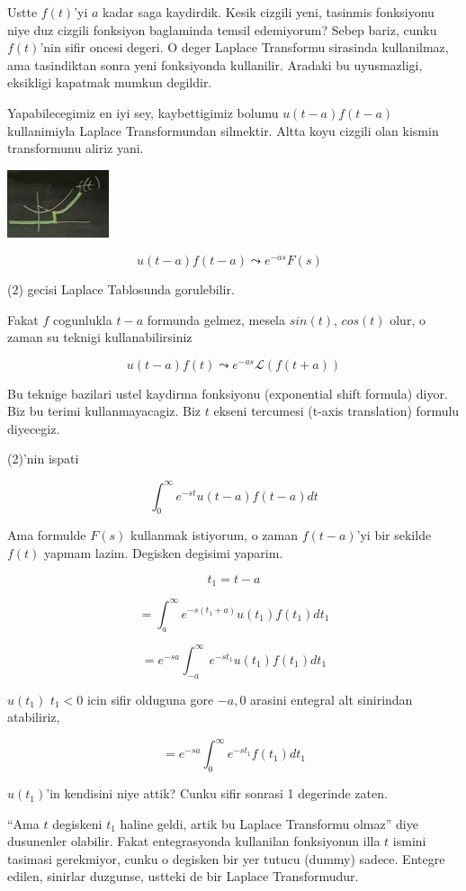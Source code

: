 \documentclass[12pt,fleqn]{article}\usepackage{../common}
\begin{document}
Ustte $f(t)$'yi $a$ kadar saga kaydirdik. Kesik cizgili yeni, tasinmis
fonksiyonu niye duz cizgili fonksiyon baglaminda temsil edemiyorum? Sebep
bariz, cunku $f(t)$'nin sifir oncesi degeri. O deger Laplace Transformu
sirasinda kullanilmaz, ama tasindiktan sonra yeni fonksiyonda
kullanilir. Aradaki bu uyusmazligi, eksikligi kapatmak mumkun degildir. 

Yapabilecegimiz en iyi sey, kaybettigimiz bolumu $u(t-a)f(t-a)$ kullanimiyla
Laplace Transformundan silmektir. Altta koyu cizgili olan kismin
transformunu aliriz yani.

\includegraphics[height=2cm]{22_8.png}

\[ u(t-a)f(t-a) \leadsto e^{-as}F(s) 
\ \ \ \label{2}
\]

(2) gecisi Laplace Tablosunda gorulebilir.

Fakat $f$ cogunlukla $t-a$ formunda gelmez, mesela $sin(t)$, $cos(t)$
olur, o zaman su teknigi kullanabilirsiniz

\[ u(t-a)f(t) \leadsto e^{-as}\mathcal{L}(f(t+a)) \]

Bu teknige bazilari ustel kaydirma fonksiyonu (exponential shift formula)
diyor. Biz bu terimi kullanmayacagiz. Biz $t$ ekseni tercumesi (t-axis
translation) formulu diyecegiz. 

(2)'nin ispati

\[ \int_{0}^{\infty}e^{-st}u(t-a)f(t-a) dt \]

Ama formulde $F(s)$ kullanmak istiyorum, o zaman $f(t-a)$'yi bir sekilde
$f(t)$ yapmam lazim. Degisken degisimi yaparim. 

\[ t_1 = t-a \]

\[ = \int_{a}^{\infty}e^{-s(t_1+a)}u(t_1)f(t_1) dt_1 \]

\[ = e^{-sa} \int_{-a}^{\infty}e^{-st_1}u(t_1)f(t_1) dt_1 \]

$u(t_1)$ $t_1<0$ icin sifir olduguna gore $-a,0$ arasini entegral alt
sinirindan atabiliriz, 

\[ = e^{-sa} \int_{0}^{\infty}e^{-st_1}f(t_1) dt_1 \]

$u(t_1)$'in kendisini niye attik? Cunku sifir sonrasi 1 degerinde zaten. 

``Ama $t$ degiskeni $t_1$ haline geldi, artik bu Laplace Transformu olmaz''
diye dusunenler olabilir. Fakat entegrasyonda kullanilan fonksiyonun illa
$t$ ismini tasimasi gerekmiyor, cunku o degisken bir yer tutucu (dummy)
sadece. Entegre edilen, sinirlar duzgunse, ustteki de bir Laplace
Transformudur.
\end{document}
